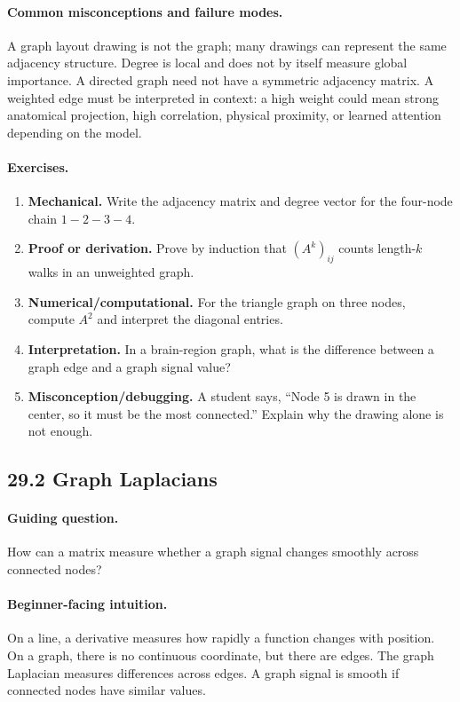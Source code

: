 \paragraph{Common misconceptions and failure modes.}
A graph layout drawing is not the graph; many drawings can represent the same adjacency structure. Degree is local and does not by itself measure global importance. A directed graph need not have a symmetric adjacency matrix. A weighted edge must be interpreted in context: a high weight could mean strong anatomical projection, high correlation, physical proximity, or learned attention depending on the model.

\paragraph{Exercises.}
\begin{enumerate}[label=\textbf{29.1.\arabic*.}, leftmargin=*]
\item \textbf{Mechanical.} Write the adjacency matrix and degree vector for the four-node chain \(1-2-3-4\).
\item \textbf{Proof or derivation.} Prove by induction that \((A^k)_{ij}\) counts length-\(k\) walks in an unweighted graph.
\item \textbf{Numerical/computational.} For the triangle graph on three nodes, compute \(A^2\) and interpret the diagonal entries.
\item \textbf{Interpretation.} In a brain-region graph, what is the difference between a graph edge and a graph signal value?
\item \textbf{Misconception/debugging.} A student says, ``Node 5 is drawn in the center, so it must be the most connected.'' Explain why the drawing alone is not enough.
\end{enumerate}

\subsection{29.2 Graph Laplacians}

\paragraph{Guiding question.}
How can a matrix measure whether a graph signal changes smoothly across connected nodes?

\paragraph{Beginner-facing intuition.}
On a line, a derivative measures how rapidly a function changes with position. On a graph, there is no continuous coordinate, but there are edges. The graph Laplacian measures differences across edges. A graph signal is smooth if connected nodes have similar values.

